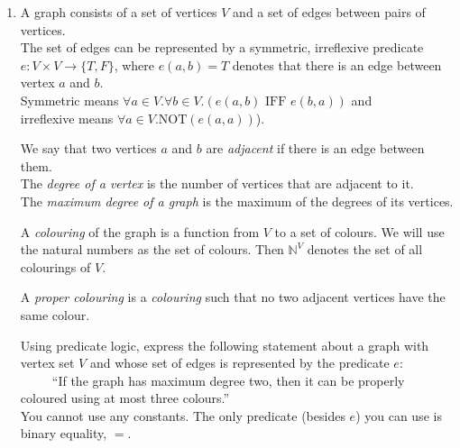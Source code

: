 \documentclass[12pt]{article}
\newcommand{\nnot}{\mathrm{NOT}}
\newcommand{\aand}{\,\,\mathrm{AND}\,\,}
\newcommand{\oor}{\,\,\mathrm{OR}\,\,}
\newcommand{\iimplies}{\,\,\mathrm{IMPLIES}\,\,}
\newcommand{\iif}{\,\,\mathrm{IFF}\,\,}
\newcommand{\nats}{\mathbb{N}}
\begin{document}
\begin{enumerate}
\begin{enumerate}


 
\end{enumerate}



\item
A graph consists of a set of vertices  $V$ and a set of edges between pairs of vertices.\\
The set of edges can be represented by a symmetric, irreflexive predicate $e: V \times V \to \{T,F\}$, where $e(a,b) = T$ denotes that there is an edge between vertex $a$ and $b$.\\
Symmetric means  $\forall a \in V. \forall b \in V. (e(a,b) \iif e(b,a))$ and\\
irreflexive means  $\forall a \in V.\nnot (e(a,a))$).

We say that two vertices $a$ and $b$ are \emph{adjacent} if there is an edge between them.\\
The \emph{degree of a vertex}  is the number of vertices that are adjacent to it.\\
The \emph{maximum degree of a graph} is the maximum of the degrees of its vertices.

A \emph{colouring} of the graph is a function from $V$ to a set of colours. We will use the natural numbers
 as the set of colours. Then $\nats^V$ denotes the set of all colourings of $V$.

A \textit{proper colouring} is a \textit{colouring} such that no two adjacent vertices have the same colour.


Using predicate logic, express the following statement  about a graph with vertex set $V$ and whose set of edges is represented by the predicate $e$:\\
\ \ \ \ \ ``If the graph has maximum degree two, then it can be properly coloured using at most three colours.''\\
You cannot use any constants. 
The only predicate (besides $e$) you can use is binary equality, $=$.


\end{enumerate}
\end{document}
